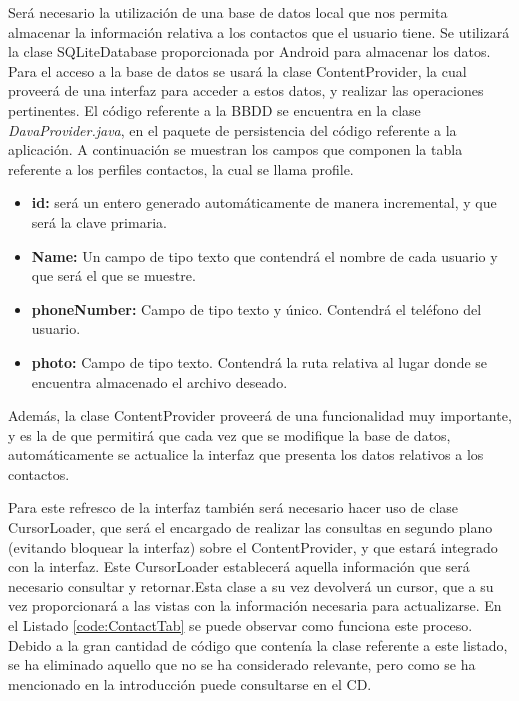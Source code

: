 Será necesario la utilización de una base de datos local que nos permita almacenar la información relativa a los contactos que el usuario tiene. Se utilizará la clase SQLiteDatabase proporcionada por Android para almacenar los datos. Para el acceso a la base de datos se usará la clase ContentProvider, la cual proveerá de una interfaz para acceder a estos datos, y realizar las operaciones pertinentes. El código referente a la \ac{BBDD} se encuentra en la clase \textit{DavaProvider.java}, en el paquete de persistencia del código referente a la aplicación. A continuación se muestran los campos que componen la tabla referente a los perfiles contactos, la cual se llama profile.
\begin{itemize}
\item \textbf{\textunderscore id:} será un entero generado automáticamente de manera incremental, y que será la clave primaria.
\item \textbf{Name:} Un campo de tipo texto que contendrá el nombre de cada usuario y que será el que se muestre.
\item \textbf{phoneNumber:} Campo de tipo texto y único. Contendrá el teléfono del usuario.
\item \textbf{photo:} Campo de tipo texto. Contendrá la ruta relativa al lugar donde se encuentra almacenado el archivo deseado.
\end{itemize}

Además, la clase ContentProvider proveerá de una funcionalidad muy importante, y es la de que permitirá que cada vez que se modifique la base de datos, automáticamente se actualice la interfaz que presenta los datos relativos a los contactos. 


Para este refresco de la interfaz también será necesario hacer uso de clase CursorLoader, que será el encargado de realizar las consultas en segundo plano (evitando bloquear la interfaz) sobre el ContentProvider, y que estará integrado con la interfaz. Este CursorLoader establecerá aquella información que será necesario consultar y retornar.Esta clase a su vez devolverá un cursor, que a su vez proporcionará a las vistas con la información necesaria para actualizarse. En el Listado \ref{code:ContactTab} se puede observar como funciona este proceso. Debido a la gran cantidad de código que contenía la clase referente a este listado, se ha eliminado aquello que no se ha considerado relevante, pero como se ha mencionado en la introducción puede consultarse en el CD. \\




